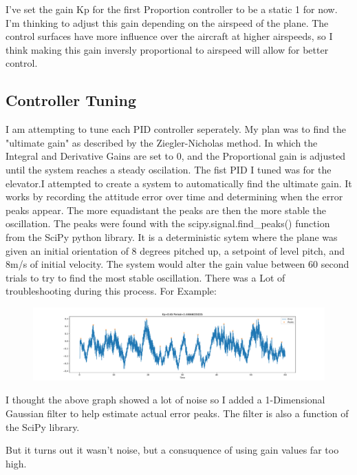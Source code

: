 \documentclass[11pt]{scrartcl} %
\begin{document}
I've set the gain Kp for the first Proportion controller to be a static 1 for now. I'm thinking to adjust this gain depending on the airspeed of the plane. The control surfaces have more influence over the aircraft at higher airspeeds, so I think making this gain inversly proportional to airspeed will allow for better control.

\subsection{Controller Tuning}
I am attempting to tune each PID controller seperately. My plan was to find the "ultimate gain" as described by the Ziegler-Nicholas method. In which the Integral and Derivative Gains are set to 0, and the Proportional gain is adjusted until the system reaches a steady oscilation. The fist PID I tuned was for the elevator.I attempted to create a system to automatically find the ultimate gain. It works by recording the attitude error over time and determining when the error peaks appear. The more equadistant the peaks are then the more stable the oscillation. The peaks were found with the scipy.signal.find\_peaks() function from the SciPy python library. It is a deterministic sytem where the plane was given an initial orientation of 8 degrees pitched up, a setpoint of level pitch, and 8m/s of initial velocity. The system would alter the gain value between 60 second trials to try to find the most stable oscillation. There was a Lot of troubleshooting during this process. For Example:

\begin{figure}[ht!] %
	\centering
	\includegraphics[trim={5cm 0 5cm 0},clip,width=\textwidth]{PIDnoise.pdf} 
\end{figure}

I thought the above graph showed a lot of noise so I added a 1-Dimensional Gaussian filter to help estimate actual error peaks. The filter is also a function of the SciPy library.


But it turns out it wasn't noise, but a consuquence of using gain values far too high.
\end{document}
